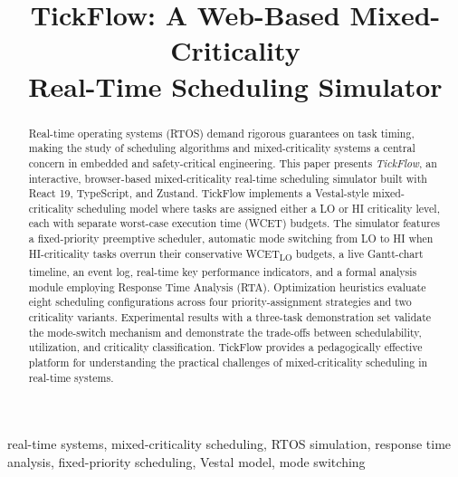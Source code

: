 \documentclass[conference]{IEEEtran}
\begin{document}
\title{TickFlow: A Web-Based Mixed-Criticality\\Real-Time Scheduling Simulator}

\author{
}

\maketitle

\begin{abstract}
Real-time operating systems (RTOS) demand rigorous guarantees on task timing, making the study of scheduling algorithms and mixed-criticality systems a central concern in embedded and safety-critical engineering. This paper presents \textit{TickFlow}, an interactive, browser-based mixed-criticality real-time scheduling simulator built with React 19, TypeScript, and Zustand. TickFlow implements a Vestal-style mixed-criticality scheduling model where tasks are assigned either a LO or HI criticality level, each with separate worst-case execution time (WCET) budgets. The simulator features a fixed-priority preemptive scheduler, automatic mode switching from LO to HI when HI-criticality tasks overrun their conservative WCET\textsubscript{LO} budgets, a live Gantt-chart timeline, an event log, real-time key performance indicators, and a formal analysis module employing Response Time Analysis (RTA). Optimization heuristics evaluate eight scheduling configurations across four priority-assignment strategies and two criticality variants. Experimental results with a three-task demonstration set validate the mode-switch mechanism and demonstrate the trade-offs between schedulability, utilization, and criticality classification. TickFlow provides a pedagogically effective platform for understanding the practical challenges of mixed-criticality scheduling in real-time systems.
\end{abstract}

\begin{IEEEkeywords}
real-time systems, mixed-criticality scheduling, RTOS simulation, response time analysis, fixed-priority scheduling, Vestal model, mode switching
\end{IEEEkeywords}
\end{document}

